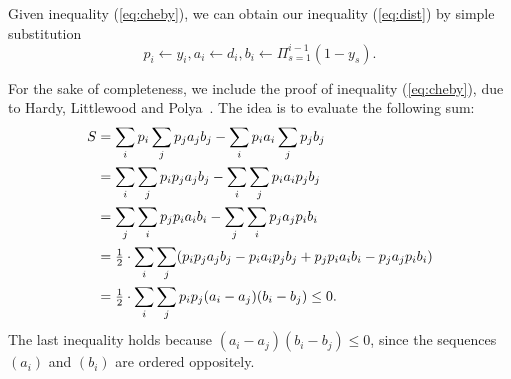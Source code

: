 \documentclass[11pt]{article}
\begin{document}
Given inequality (\ref{eq:cheby}), we can obtain our inequality
(\ref{eq:dist}) by simple substitution
%
\begin{equation*}
  p_i \leftarrow y_i, a_i \leftarrow d_i, b_i \leftarrow
  \Pi_{s=1}^{i-1} (1-y_s).
\end{equation*}

For the sake of completeness, we include the proof of inequality (\ref{eq:cheby}), 
due to Hardy, Littlewood and Polya~\cite{HardyLP88}. The idea is to evaluate the 
following sum:
%
\begin{align*}
  S &= \sum_i p_i \sum_j p_j a_j b_j - \sum_i p_i a_i \sum_j p_j b_j
	\\
  & = \sum_i \sum_j p_i p_j a_j b_j - \sum_i \sum_j p_i a_i p_j b_j
	\\
  & = \sum_j \sum_i p_j p_i a_i b_i - \sum_j \sum _i p_j a_j p_i b_i
	\\
	&= {\mbox{$\frac{1}{2}$}} \cdot \sum_i \sum_j (p_i p_j a_j b_j - p_i a_i p_j b_j + p_j p_i a_i
  							b_i - p_j a_j p_i b_i)
\\
  &= {\mbox{$\frac{1}{2}$}} \cdot \sum_i \sum_j p_i p_j (a_i - a_j)(b_i - b_j) \leq 0.
\end{align*}
The last inequality holds because $(a_i-a_j)(b_i-b_j) \leq 0$, since the sequences
$(a_i)$ and $(b_i)$ are ordered oppositely.
\end{document}
